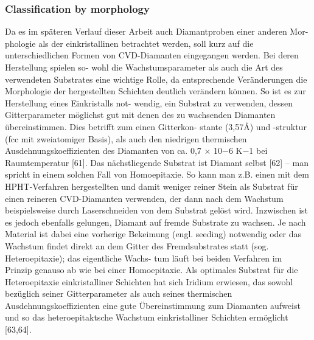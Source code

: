     \subsubsection{Classification by morphology}

      Da es im späteren Verlauf dieser Arbeit auch Diamantproben einer anderen Mor- phologie als der einkristallinen betrachtet werden, soll kurz auf die unterschiedlichen Formen von CVD-Diamanten eingegangen werden. Bei deren Herstellung spielen so- wohl die Wachstumsparameter als auch die Art des verwendeten Substrates eine wichtige Rolle, da entsprechende Veränderungen die Morphologie der hergestellten Schichten deutlich verändern können. So ist es zur Herstellung eines Einkristalls not- wendig, ein Substrat zu verwenden, dessen Gitterparameter möglichst gut mit denen des zu wachsenden Diamanten übereinstimmen. Dies betrifft zum einen Gitterkon- stante (3,57Å) und -struktur (fcc mit zweiatomiger Basis), als auch den niedrigen thermischen Ausdehnungskoeffizienten des Diamanten von ca. 0,7 × 10−6 K−1 bei Raumtemperatur [61]. Das nächstliegende Substrat ist Diamant selbst [62] – man spricht in einem solchen Fall von Homoepitaxie. So kann man z.B. einen mit dem HPHT-Verfahren hergestellten und damit weniger reiner Stein als Substrat für einen reineren CVD-Diamanten verwenden, der dann nach dem Wachstum beispielsweise durch Laserschneiden von dem Substrat gelöst wird. Inzwischen ist es jedoch ebenfalls gelungen, Diamant auf fremde Substrate zu wachsen. Je nach Material ist dabei eine vorherige Bekeimung (engl. seeding) notwendig oder das Wachstum findet direkt an dem Gitter des Fremdsubstrates statt (sog. Heteroepitaxie); das eigentliche Wachs- tum läuft bei beiden Verfahren im Prinzip genauso ab wie bei einer Homoepitaxie. Als optimales Substrat für die Heteroepitaxie einkristalliner Schichten hat sich Iridium erwiesen, das sowohl bezüglich seiner Gitterparameter als auch seines thermischen Ausdehnungskoeffizienten eine gute Übereinstimmung zum Diamanten aufweist und so das heteroepitaktsche Wachstum einkristalliner Schichten ermöglicht [63,64].

